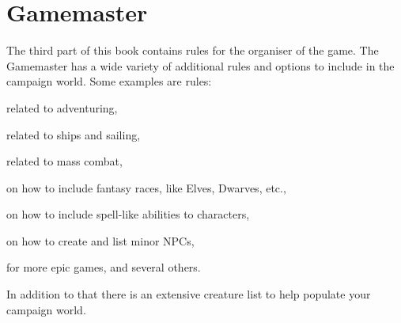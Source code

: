 \section{Gamemaster}
The third part of this book contains rules for the organiser of the game. The Gamemaster has a wide variety of additional rules and options to include in the campaign world. Some examples are rules:
\begin{rpg-list}
\item related to adventuring,
\item related to ships and sailing,
\item related to mass combat,
\item on how to include fantasy races, like Elves, Dwarves, etc.,
\item on how to include spell-like abilities to characters,
\item on how to create and list minor NPCs,
\item for more epic games, and several others.
\end{rpg-list}

In addition to that there is an extensive creature list to help populate your campaign world.

